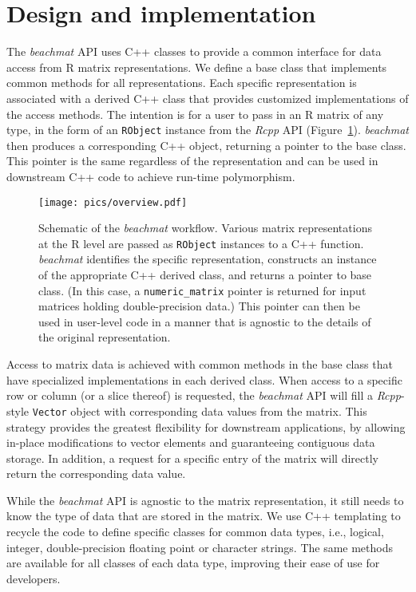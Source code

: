 \documentclass[10pt,letterpaper]{article}
\newcommand{\beachmat}{\textit{beachmat}}
\newcommand{\code}[1]{\texttt{#1}}
\begin{document}
\section*{Design and implementation}
The \beachmat{} API uses C++ classes to provide a common interface for data access from R matrix representations.
We define a base class that implements common methods for all representations.
Each specific representation is associated with a derived C++ class that provides customized implementations of the access methods.
The intention is for a user to pass in an R matrix of any type, in the form of an \code{RObject} instance from the \textit{Rcpp} API (Figure~\ref{fig:beachoverview}).
\beachmat{} then produces a corresponding C++ object, returning a pointer to the base class.
This pointer is the same regardless of the representation and can be used in downstream C++ code to achieve run-time polymorphism.

\begin{figure}[btp]
    \begin{center}
        \texttt{[image: pics/overview.pdf]}
    \end{center}
    \caption{Schematic of the \beachmat{} workflow.
        Various matrix representations at the R level are passed as \code{RObject} instances to a C++ function.
        \beachmat{} identifies the specific representation, constructs an instance of the appropriate C++ derived class, and returns a pointer to base class.
        (In this case, a \code{numeric\_matrix} pointer is returned for input matrices holding double-precision data.)
        This pointer can then be used in user-level code in a manner that is agnostic to the details of the original representation.
    }
    \label{fig:beachoverview}
\end{figure}

Access to matrix data is achieved with common methods in the base class that have specialized implementations in each derived class. 
When access to a specific row or column (or a slice thereof) is requested, the \beachmat{} API will fill a \textit{Rcpp}-style \code{Vector} object with corresponding data values from the matrix.
This strategy provides the greatest flexibility for downstream applications, by allowing in-place modifications to vector elements and guaranteeing contiguous data storage. 
In addition, a request for a specific entry of the matrix will directly return the corresponding data value.

While the \beachmat{} API is agnostic to the matrix representation, it still needs to know the type of data that are stored in the matrix.
We use C++ templating to recycle the code to define specific classes for common data types, i.e., logical, integer, double-precision floating point or character strings.
The same methods are available for all classes of each data type, improving their ease of use for developers.
\end{document}
